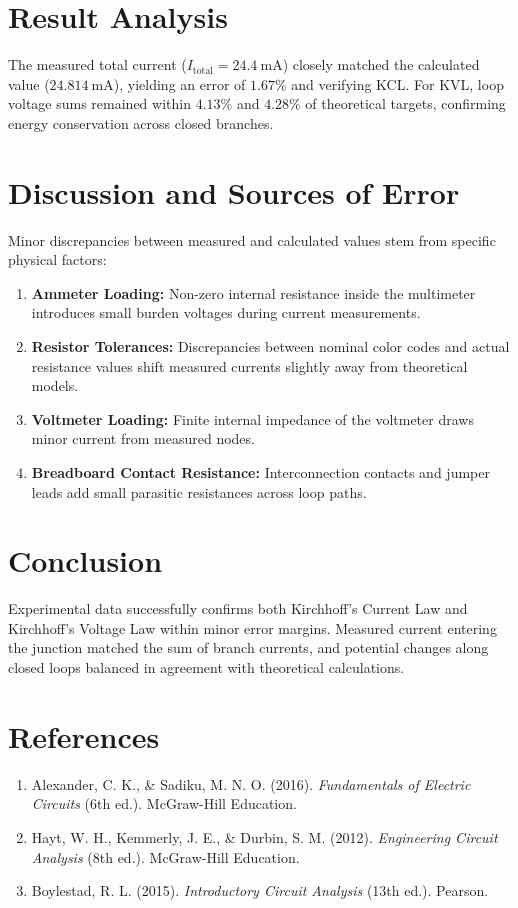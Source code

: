 \section{Result Analysis}
The measured total current ($I_{\text{total}} = \qty{24.4}{\milli\ampere}$) closely matched the calculated value ($\qty{24.814}{\milli\ampere}$), yielding an error of $1.67\%$ and verifying KCL. For KVL, loop voltage sums remained within $4.13\%$ and $4.28\%$ of theoretical targets, confirming energy conservation across closed branches.

\section{Discussion and Sources of Error}
Minor discrepancies between measured and calculated values stem from specific physical factors:
\begin{enumerate}
	\item \textbf{Ammeter Loading:} Non-zero internal resistance inside the multimeter introduces small burden voltages during current measurements.
	\item \textbf{Resistor Tolerances:} Discrepancies between nominal color codes and actual resistance values shift measured currents slightly away from theoretical models.
	\item \textbf{Voltmeter Loading:} Finite internal impedance of the voltmeter draws minor current from measured nodes.
	\item \textbf{Breadboard Contact Resistance:} Interconnection contacts and jumper leads add small parasitic resistances across loop paths.
\end{enumerate}

\section{Conclusion}
Experimental data successfully confirms both Kirchhoff's Current Law and Kirchhoff's Voltage Law within minor error margins. Measured current entering the junction matched the sum of branch currents, and potential changes along closed loops balanced in agreement with theoretical calculations.

\section{References}
\begin{tcolorbox}[colback=gray!5, colframe=gray!40, arc=2mm]
	\begin{enumerate}
		\item Alexander, C. K., \& Sadiku, M. N. O. (2016). \textit{Fundamentals of Electric Circuits} (6th ed.). McGraw-Hill Education.
		\item Hayt, W. H., Kemmerly, J. E., \& Durbin, S. M. (2012). \textit{Engineering Circuit Analysis} (8th ed.). McGraw-Hill Education.
		\item Boylestad, R. L. (2015). \textit{Introductory Circuit Analysis} (13th ed.). Pearson.
	\end{enumerate}
\end{tcolorbox}

